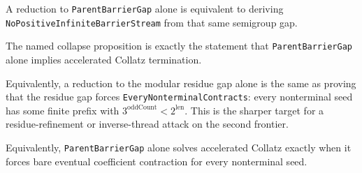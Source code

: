 \begin{theorem}
  \label{thm:collatz-parent-gap-one-frontier-criterion}
  \leanok
  A reduction to \texttt{ParentBarrierGap} alone is equivalent to deriving
  \texttt{NoPositiveInfiniteBarrierStream} from that same semigroup gap.
\end{theorem}
\begin{theorem}
  \label{thm:collatz-parent-one-lock-termination}
  \leanok
  The named collapse proposition is exactly the statement that \texttt{ParentBarrierGap}
  alone implies accelerated Collatz termination.
\end{theorem}
\begin{theorem}
  \label{thm:collatz-one-frontier-eventual-contracts}
  \leanok
  Equivalently, a reduction to the modular residue gap alone is the same as proving that
  the residue gap forces \texttt{EveryNonterminalContracts}: every nonterminal seed has some
  finite prefix with \(3^{\mathrm{oddCount}}<2^{\mathrm{len}}\). This is the sharper target
  for a residue-refinement or inverse-thread attack on the second frontier.
\end{theorem}
\begin{theorem}
  \label{thm:collatz-parent-gap-eventual-contracts}
  \leanok
  Equivalently, \texttt{ParentBarrierGap} alone solves accelerated Collatz exactly
  when it forces bare eventual coefficient contraction for every nonterminal seed.
\end{theorem}
